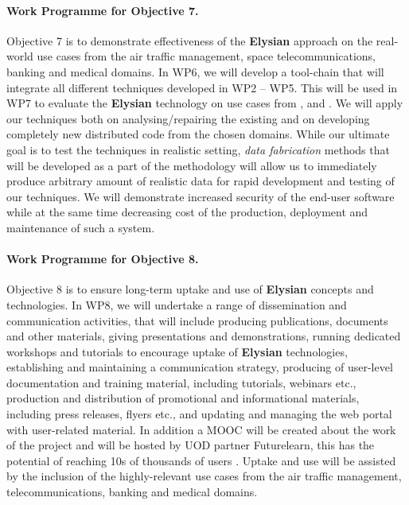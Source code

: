 \documentclass[a4paper,11pt]{article}
\newcommand{\project}[1]{\textbf{#1}\xspace}
\newcommand{\SECURITY}{\project{Elysian}}
\newcommand{\TheProject}{\SECURITY}
\begin{document}
\paragraph{Work Programme for Objective 7.} 

Objective 7 is to demonstrate effectiveness of the \TheProject{} approach on the real-world use cases from the air traffic management, space telecommunications, banking and medical domains. In WP6, we will develop a tool-chain that will integrate all different techniques developed in WP2 -- WP5. This will be used in WP7 to evaluate the \TheProject{} technology  on use cases from \SOPRAshort{}, \FRQshort{} and \DEMshort{}. We will apply our techniques both on analysing/repairing the existing and on developing completely new distributed code from the chosen domains. While our ultimate goal is to test the techniques in realistic setting, \emph{data fabrication} methods that will be developed as a part of the methodology will allow us to immediately produce arbitrary amount of realistic data for rapid development and testing of our techniques. We will demonstrate increased security of the end-user software while at the same time decreasing cost of the production, deployment and maintenance of such a system.

\paragraph{Work Programme for Objective 8.}

Objective 8 is to ensure long-term uptake and use of \TheProject{} concepts and technologies. In WP8, we will undertake a range of dissemination and communication activities, that will include producing publications, documents and other materials, giving presentations and demonstrations, running dedicated workshops and tutorials to encourage uptake of \TheProject{} technologies, establishing and maintaining a communication strategy, producing of user-level documentation and training material, including tutorials, webinars etc., production and distribution of promotional and informational materials, including press releases, flyers etc., and updating and managing the web portal with user-related material.  In addition a MOOC will be created about the work of the project and will be hosted by UOD partner Futurelearn, this has the potential of reaching 10s of thousands of users .  Uptake and use will be assisted by the inclusion of the highly-relevant use cases from the air traffic management, telecommunications, banking and medical domains.
\end{document}
